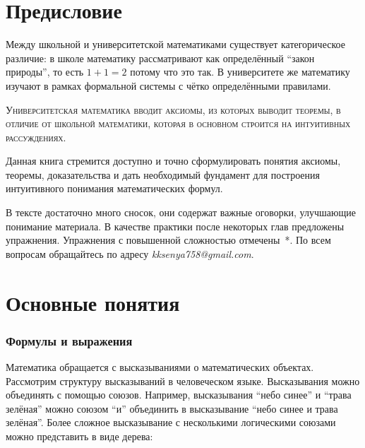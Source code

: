 \part{Предисловие}

Между школьной и университетской математиками существует категорическое
различие: в школе математику рассматривают как определённый ``закон природы'',
то есть $1+1=2$ потому что это так. В университете же математику изучают
в рамках формальной системы с чётко определёнными правилами.

\textsc{Университетская математика вводит аксиомы, из которых выводит теоремы,
  в отличие от школьной математики, которая
  в основном строится на интуитивных рассуждениях.}

Данная книга стремится доступно и точно сформулировать понятия аксиомы,
теоремы, доказательства и дать необходимый фундамент для построения
интуитивного понимания математических формул.

В тексте достаточно много сносок, они содержат важные оговорки,
улучшающие понимание материала. В качестве практики
после некоторых глав предложены упражнения. Упражнения с повышенной сложностью
отмечены~*.
По всем вопросам обращайтесь по адресу {\sl kksenya758@gmail.com}.

\part{Основные понятия}

\section{Формулы и выражения}

Математика обращается с высказываниями о математических объектах.
Рассмотрим структуру высказываний в человеческом языке.
Высказывания можно объединять с помощью
союзов. Например, высказывания ``небо синее''
и ``трава зелёная'' можно союзом ``и'' объединить в высказывание
``небо синее и трава зелёная''. Более сложное высказывание с несколькими
логическими союзами можно представить в виде дерева:

\vspace{-1.25em}
\begin{center}
\end{center}

